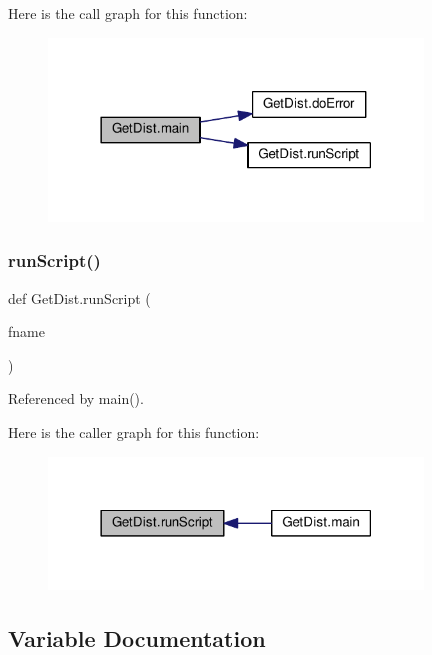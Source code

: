 Here is the call graph for this function\+:
\nopagebreak
\begin{figure}[H]
\begin{center}
\leavevmode
\includegraphics[width=282pt]{namespaceGetDist_acc8ec19c3d04e93378678f5ac0f776cf_cgraph}
\end{center}
\end{figure}
\mbox{\label{namespaceGetDist_a6fd7cad05485639b288731bcf603e40b}} 
\subsubsection{\texorpdfstring{run\+Script()}{runScript()}}
{\footnotesize\ttfamily def Get\+Dist.\+run\+Script (\begin{DoxyParamCaption}\item[{}]{fname }\end{DoxyParamCaption})}



Referenced by main().

Here is the caller graph for this function\+:
\nopagebreak
\begin{figure}[H]
\begin{center}
\leavevmode
\includegraphics[width=282pt]{namespaceGetDist_a6fd7cad05485639b288731bcf603e40b_icgraph}
\end{center}
\end{figure}


\subsection{Variable Documentation}
\mbox{\label{namespaceGetDist_ad987e32283ad3cafeefa559e83cfd9b7}} 
